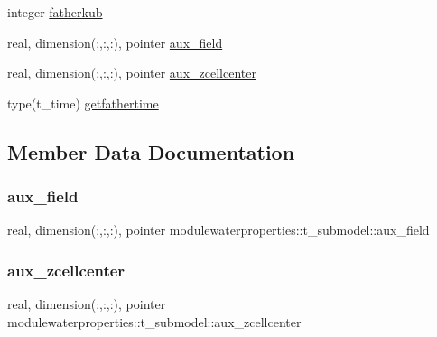 \begin{DoxyCompactItemize}
\item 
integer \mbox{\hyperlink{structmodulewaterproperties_1_1t__submodel_a6e7d734a9d6dd63b613f8c1f9a862db1}{fatherkub}}
\item 
real, dimension(\+:,\+:,\+:), pointer \mbox{\hyperlink{structmodulewaterproperties_1_1t__submodel_a8ed9bbe7b7785f49fae7cf85c689331f}{aux\+\_\+field}}
\item 
real, dimension(\+:,\+:,\+:), pointer \mbox{\hyperlink{structmodulewaterproperties_1_1t__submodel_a66924d6b5fe6d4f9921dc457b3872a9b}{aux\+\_\+zcellcenter}}
\item 
type(t\+\_\+time) \mbox{\hyperlink{structmodulewaterproperties_1_1t__submodel_a58178e96b09adfce8fe40170ef605a31}{getfathertime}}
\end{DoxyCompactItemize}


\subsection{Member Data Documentation}
\mbox{\label{structmodulewaterproperties_1_1t__submodel_a8ed9bbe7b7785f49fae7cf85c689331f}} 
\subsubsection{\texorpdfstring{aux\+\_\+field}{aux\_field}}
{\footnotesize\ttfamily real, dimension(\+:,\+:,\+:), pointer modulewaterproperties\+::t\+\_\+submodel\+::aux\+\_\+field\hspace{0.3cm}{\ttfamily [private]}}

\mbox{\label{structmodulewaterproperties_1_1t__submodel_a66924d6b5fe6d4f9921dc457b3872a9b}} 
\subsubsection{\texorpdfstring{aux\+\_\+zcellcenter}{aux\_zcellcenter}}
{\footnotesize\ttfamily real, dimension(\+:,\+:,\+:), pointer modulewaterproperties\+::t\+\_\+submodel\+::aux\+\_\+zcellcenter\hspace{0.3cm}{\ttfamily [private]}}

